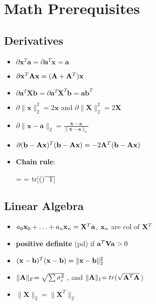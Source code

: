 
\section{Math Prerequisites}

\subsection{Derivatives }

\begin{itemize}
	\item $\partial \mathbf{x}^T \mathbf{a} = \partial \mathbf{a}^T \mathbf{x} = \mathbf{a}$
	\item $\partial \mathbf{x}^T\mathbf{A}\mathbf{x} = (\mathbf{A} + \mathbf{A}^T)\mathbf{x}$
	\item $\partial \mathbf{a}^T \mathbf{X} \mathbf{b} = \partial \mathbf{a}^T \mathbf{X}^T \mathbf{b} = \mathbf{a} \mathbf{b}^T$
	\item $\partial \lVert \mathbf{x} \lVert^2_2 = 2\mathbf{x}$ and $\partial \lVert \mathbf{X} \lVert^2_2 = 2\mathbf{X}$
	\item $\partial \lVert \mathbf{x}-\mathbf{a} \lVert_2 = \frac{\mathbf{x}-\mathbf{a}}{\lVert \mathbf{x}-\mathbf{a} \lVert_2}$
	\item $\partial (\mathbf{b}-\mathbf{A}\mathbf{x})^T(\mathbf{b}-\mathbf{A}\mathbf{x}) = -2\mathbf{A}^T(\mathbf{b}-\mathbf{A}\mathbf{x})$
	\item \textbf{Chain rule}:
		\begin{myalign*}
			 =  = tr[()^T]
		\end{myalign*}

\end{itemize}

\subsection{Linear Algebra}

\begin{itemize}
	\item $a_0 \mathbf{x}_0 + \hdots + a_n \mathbf{x}_n = \mathbf{X}^T \mathbf{a}$, $\mathbf{x}_n$ are col of $\mathbf{X}^T$
    \item \textbf{positive definite} (pd) if $\mathbf{a}^T \mathbf{V} \mathbf{a} > 0$
	\item $(\mathbf{x}-\mathbf{b})^T (\mathbf{x}-\mathbf{b}) = \lVert \mathbf{x} - \mathbf{b} \lVert^2_2 $
	\item $\lVert \mathbf{A} \lVert_F = \sqrt{\sum \sigma_i^2}$ , and $\lVert \mathbf{A} \lVert_1 = tr({\sqrt{\mathbf{A}^T \mathbf{A}}}$)
	\item $\lVert \mathbf{X} \lVert_2 =\lVert \mathbf{X}^T \lVert_2$
\end{itemize}

